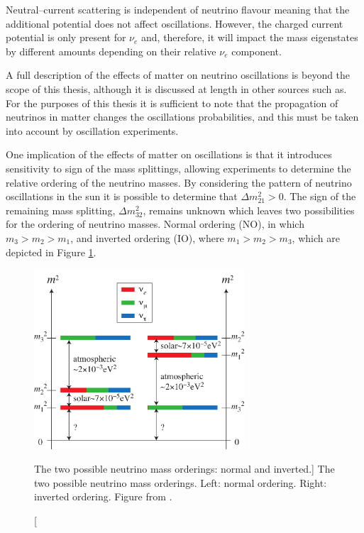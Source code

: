 Neutral--current scattering is independent of neutrino flavour meaning that
the additional potential does not affect oscillations. However, the charged
current potential is only present for $\nu_e$ and, therefore, it will impact the
mass eigenstates by different amounts depending on their relative $\nu_e$
component.

A full description of the effects of matter on neutrino oscillations is beyond
the scope of this thesis, although it is discussed at length in other sources
such as\cite{GiuntiCarlo2007FoNP}. For the purposes of this thesis it is
sufficient to note that the propagation of neutrinos in matter changes the
oscillations probabilities, and this must be taken into account by oscillation
experiments.

One implication of the effects of matter on oscillations is that it introduces
sensitivity to sign of the mass splittings\cite{GiuntiCarlo2007FoNP}, 
allowing experiments to determine the relative ordering of the neutrino 
masses. By considering the pattern of neutrino oscillations in the sun it is 
possible to determine that $\Delta m_{21}^2 > 0$\cite{PhysRevD.98.030001}. 
The sign of the remaining mass splitting, $\Delta m_{32}^2$, remains unknown 
which leaves two possibilities for the ordering of neutrino masses. Normal 
ordering (NO), in which $m_3 > m_2 > m_1$, and inverted ordering (IO), where $m_1 > m_2 
> m_3$, which are depicted in Figure \ref{fig:mass_ordering}. 
\begin{figure}
	\centering
	\includegraphics[width=0.7\textwidth]{figures/mass.pdf}
	\caption
	[The two possible neutrino mass orderings: normal and inverted.]
	{The two possible neutrino mass orderings. Left: normal ordering. Right: 
	inverted ordering.  Figure from \cite{SKing}.}
	\label{fig:mass_ordering}
\end{figure}

